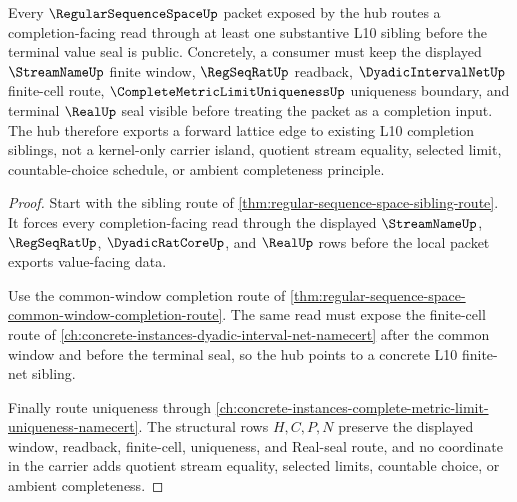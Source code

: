 \begin{theorem}
\label{thm:regular-sequence-space-hub-forward-link}
Every $\RegularSequenceSpaceUp$ packet exposed by the hub routes a
completion-facing read through at least one substantive L10 sibling before the
terminal value seal is public. Concretely, a consumer must keep the displayed
$\StreamNameUp$ finite window, $\RegSeqRatUp$ readback, $\DyadicIntervalNetUp$
finite-cell route, $\CompleteMetricLimitUniquenessUp$ uniqueness boundary, and
terminal $\RealUp$ seal visible before treating the packet as a completion
input. The hub therefore exports a forward lattice edge to existing L10
completion siblings, not a kernel-only carrier island, quotient stream
equality, selected limit, countable-choice schedule, or ambient completeness
principle.
\end{theorem}
\begin{proof}
Start with the sibling route of
\autoref{thm:regular-sequence-space-sibling-route}. It forces every
completion-facing read through the displayed $\StreamNameUp$, $\RegSeqRatUp$,
$\DyadicRatCoreUp$, and $\RealUp$ rows before the local packet exports
value-facing data.

Use the common-window completion route of
\autoref{thm:regular-sequence-space-common-window-completion-route}. The same
read must expose the finite-cell route of
\autoref{ch:concrete-instances-dyadic-interval-net-namecert} after the common
window and before the terminal seal, so the hub points to a concrete L10
finite-net sibling.

Finally route uniqueness through
\autoref{ch:concrete-instances-complete-metric-limit-uniqueness-namecert}.
The structural rows $H,C,P,N$ preserve the displayed window, readback,
finite-cell, uniqueness, and Real-seal route, and no coordinate in the carrier
adds quotient stream equality, selected limits, countable choice, or ambient
completeness.
\end{proof}
